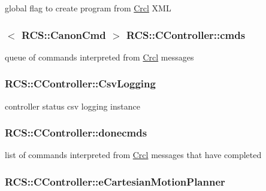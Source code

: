 global flag to create program from \hyperlink{namespaceCrcl}{Crcl} X\-M\-L \hypertarget{structRCS_1_1CController_adceba05ebd7fa94f93c131db84840d29}{
\subsubsection[{cmds}]{$<$ {\bf R\-C\-S\-::\-Canon\-Cmd} $>$ R\-C\-S\-::\-C\-Controller\-::cmds\hspace{0.3cm}{\ttfamily [static]}}}\label{structRCS_1_1CController_adceba05ebd7fa94f93c131db84840d29}
queue of commands interpreted from \hyperlink{namespaceCrcl}{Crcl} messages \hypertarget{structRCS_1_1CController_a7e21b1156fe37407bae1ba468815206c}{
\subsubsection[{Csv\-Logging}]{ R\-C\-S\-::\-C\-Controller\-::\-Csv\-Logging\hspace{0.3cm}{\ttfamily [static]}}}\label{structRCS_1_1CController_a7e21b1156fe37407bae1ba468815206c}
controller status csv logging instance \hypertarget{structRCS_1_1CController_a093ccebe77526dc736b0ddff70dec0fc}{
\subsubsection[{donecmds}]{ R\-C\-S\-::\-C\-Controller\-::donecmds\hspace{0.3cm}{\ttfamily [static]}}}\label{structRCS_1_1CController_a093ccebe77526dc736b0ddff70dec0fc}
list of commands interpreted from \hyperlink{namespaceCrcl}{Crcl} messages that have completed \hypertarget{structRCS_1_1CController_a4174fd5467045e780fe53bde42e70735}{
\subsubsection[{e\-Cartesian\-Motion\-Planner}]{ R\-C\-S\-::\-C\-Controller\-::e\-Cartesian\-Motion\-Planner}}\label{structRCS_1_1CController_a4174fd5467045e780fe53bde42e70735}
